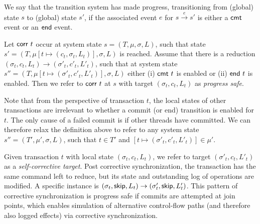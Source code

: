 \begin{definition}[Progress]
	We say that the transition system has made progress, transitioning from (global) state $s$ to (global) state $s'$, if the associated event $e$ for
	$s \stackrel{e}{\longrightarrow} s'$ is either a ${\sf cmt}$ event or an ${\sf end}$ event.
\end{definition}

\begin{definition}
	Let ${\sf corr}\ t$ occur at system state $s=(T,\mu,\sigma,L)$, such that state $s'=(T,\mu[t \mapsto (c_t,\sigma_t,L_t)],\sigma,L)$ is reached. Assume that there is a reduction
	$(\sigma_t,c_t,L_t) {\longrightarrow} (\sigma'_t,c'_t,L'_t)$, such that 
	at system state $s''=(T,\mu[t \mapsto (\sigma'_t,c'_t,L'_t)],\sigma,L)$ either (i)  ${\sf cmt}\ t$ is enabled or (ii) ${\sf end}\ t$ is enabled. Then we refer to ${\sf corr}\ t$ at $s$ with target $(\sigma_t,c_t,L_t)$ as \emph{progress safe}.
\end{definition}

Note that from the perspective of transaction $t$, the local states of other transactions are irrelevant to whether a commit (or end) transition is enabled for $t$. The only cause of a failed commit is if other threads have committed. We can therefore relax the definition above to refer to any system state $s''=(T',\mu',\sigma,L)$, such that $t \in T'$ and 
$[t \mapsto  (\sigma'_t,c'_t,L'_t)] \in \mu'$.

\begin{example}\label{Ex:selfwarp}
	Given transaction $t$ with local state $(\sigma_t,c_t,L_t)$, we refer to target
	$(\sigma'_t,c_t,L'_t)$ as a \emph{self-corrective target}. Post corrective synchronization, the transaction has the same command left to reduce, but its state and outstanding log of operations are modified. A specific instance is $(\sigma_t,{\sf skip},L_t) \rightarrow (\sigma'_t,{\sf skip},L'_t)$. This pattern of corrective synchronization is progress safe if commits are attempted at join points, which enables simulation of alternative control-flow paths (and therefore also logged effects) via corrective synchronization.
\end{example}

